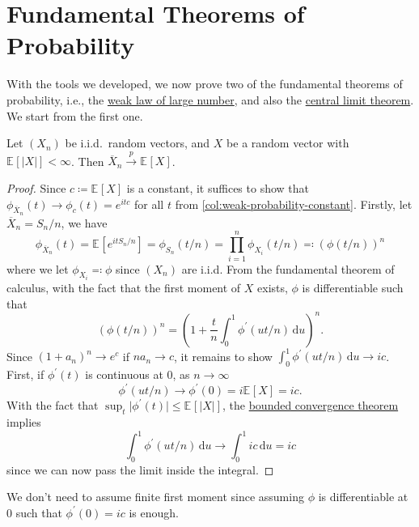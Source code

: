 \section{Fundamental Theorems of Probability}
With the tools we developed, we now prove two of the fundamental theorems of probability, i.e., the \hyperref[thm:WLLN]{weak law of large number}, and also the \hyperref[thm:CLT]{central limit theorem}. We start from the first one.

\begin{theorem}\label{thm:WLLN}
	Let \((X_n)\) be i.i.d.\ random vectors, and \(X\) be a random vector with \(\mathbb{E}_{}[\vert X \vert ] < \infty \). Then \(\overline{X} _n \overset{p}{\to } \mathbb{E}_{}[X] \).
\end{theorem}
\begin{proof}
	Since \(c \coloneqq \mathbb{E}_{}[X] \) is a constant, it suffices to show that \(\phi _{\overline{X} _n}(t) \to \phi _{c} (t) = e^{itc}\) for all \(t\) from \autoref{col:weak-probability-constant}. Firstly, let \(\overline{X} _n = S_n / n\), we have
	\[
		\phi _{\overline{X} _n}(t)
		= \mathbb{E}_{}[e^{it S_n / n}]
		= \phi _{S_n}(t / n)
		= \prod_{i=1}^{n} \phi _{X_i}(t / n)
		\eqqcolon \left( \phi (t / n) \right) ^n
	\]
	where we let \(\phi _{X_i} \eqqcolon \phi \) since \((X_n)\) are i.i.d. From the fundamental theorem of calculus, with the fact that the first moment of \(X\) exists, \(\phi \) is differentiable such that
	\[
		\left( \phi (t / n) \right) ^n
		= \left( 1 + \frac{t}{n} \int_{0}^{1} \phi ^{\prime} (u t / n) \,\mathrm{d}u  \right) ^n .
	\]
	Since \((1 + a_n)^n \to e^c\) if \(n a_n \to c\), it remains to show \(\int_{0}^{1} \phi ^{\prime} (u t / n) \,\mathrm{d}u \to ic\). First, if \(\phi ^{\prime} (t)\) is continuous at \(0\), as \(n \to \infty \)
	\[
		\phi ^{\prime} (u t / n) \to \phi ^{\prime} (0) = i \mathbb{E}_{}[X] = ic.
	\]
	With the fact that \(\sup _t \vert \phi ^{\prime} (t) \vert \leq \mathbb{E}_{}[\vert X \vert ] \), the \href{https://en.wikipedia.org/wiki/Dominated_convergence_theorem}{bounded convergence theorem} implies
	\[
		\int_{0}^{1} \phi ^{\prime} (ut / n) \,\mathrm{d}u
		\to \int_{0}^{1} ic \,\mathrm{d}u
		= ic
	\]
	since we can now pass the limit inside the integral.
\end{proof}

\begin{remark}
	We don't need to assume finite first moment since assuming \(\phi \) is differentiable at \(0\) such that \(\phi ^{\prime} (0) = ic\) is enough.
\end{remark}

